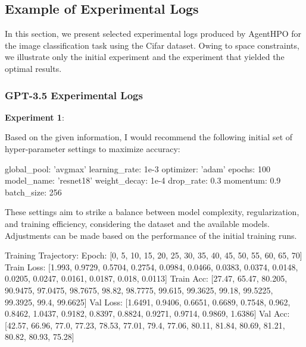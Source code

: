 \documentclass{article}
\begin{document}
\subsection{Example of Experimental Logs}
\label{section:case}
In this section, we present selected experimental logs produced by AgentHPO for the image classification task using the Cifar dataset. Owing to space constraints, we illustrate only the initial experiment and the experiment that yielded the optimal results.



\subsubsection{GPT-3.5 Experimental Logs}


\begin{tcolorbox}[enhanced jigsaw,breakable,pad at break*=1mm,
  colback=blue!5!white,colframe=blue!75!black,title=GPT-3.5 Experimental Logs,
  watermark color=white]

\textbf{Experiment 1}:

Based on the given information, I would recommend the following initial set of hyper-parameter settings to maximize accuracy:

global\_pool: 'avgmax' \newline
learning\_rate: 1e-3 \newline
optimizer: 'adam' \newline
epochs: 100 \newline
model\_name: 'resnet18' \newline
weight\_decay: 1e-4 \newline
drop\_rate: 0.3 \newline
momentum: 0.9 \newline
batch\_size: 256 \newline

These settings aim to strike a balance between model complexity, regularization, and training efficiency, considering the dataset and the available models. Adjustments can be made based on the performance of the initial training runs.


Training Trajectory:\newline
Epoch: [0, 5, 10, 15, 20, 25, 30, 35, 40, 45, 50, 55, 60, 65, 70] \newline
Train Loss: [1.993, 0.9729, 0.5704, 0.2754, 0.0984, 0.0466, 0.0383, 0.0374, 0.0148, 0.0205, 0.0247, 0.0161, 0.0187, 0.018, 0.0113] \newline
Train Acc: [27.47, 65.47, 80.205, 90.9475, 97.0475, 98.7675, 98.82, 98.7775, 99.615, 99.3625, 99.18, 99.5225, 99.3925, 99.4, 99.6625] \newline
Val Loss: [1.6491, 0.9406, 0.6651, 0.6689, 0.7548, 0.962, 0.8462, 1.0437, 0.9182, 0.8397, 0.8824, 0.9271, 0.9714, 0.9869, 1.6386] \newline
Val Acc: [42.57, 66.96, 77.0, 77.23, 78.53, 77.01, 79.4, 77.06, 80.11, 81.84, 80.69, 81.21, 80.82, 80.93, 75.28] 


\end{tcolorbox}
\end{document}
